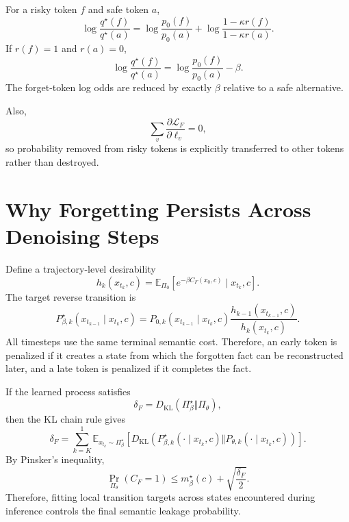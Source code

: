 \documentclass[10pt]{article}
\newcommand{\E}{\mathbb{E}}
\newcommand{\KL}{D_{\mathrm{KL}}}
\newcommand{\1}{\mathbb{I}}
\begin{document}
For a risky token $f$ and safe token $a$,
\begin{equation}
\log\frac{q^\star(f)}{q^\star(a)}
=
\log\frac{p_0(f)}{p_0(a)}
+
\log\frac{1-\kappa r(f)}{1-\kappa r(a)}.
\label{eq:odds}
\end{equation}
If $r(f)=1$ and $r(a)=0$,
\begin{equation}
\log\frac{q^\star(f)}{q^\star(a)}
=
\log\frac{p_0(f)}{p_0(a)}-\beta.
\end{equation}
The forget-token log odds are reduced by exactly $\beta$ relative to a safe alternative.

Also,
\begin{equation}
\sum_v\frac{\partial\mathcal L_F}{\partial\ell_v}=0,
\end{equation}
so probability removed from risky tokens is explicitly transferred to other tokens rather than destroyed.

\section{Why Forgetting Persists Across Denoising Steps}

Define a trajectory-level desirability
\begin{equation}
h_k(x_{t_k},c)
=
\E_{\Pi_0}
\left[
 e^{-\beta C_F(x_0,c)}
 \mid x_{t_k},c
\right].
\end{equation}
The target reverse transition is
\begin{equation}
P_{\beta,k}^\star(x_{t_{k-1}}\mid x_{t_k},c)
=
P_{0,k}(x_{t_{k-1}}\mid x_{t_k},c)
\frac{h_{k-1}(x_{t_{k-1}},c)}{h_k(x_{t_k},c)}.
\label{eq:doob}
\end{equation}
All timesteps use the same terminal semantic cost. Therefore, an early token is penalized if it creates a state from which the forgotten fact can be reconstructed later, and a late token is penalized if it completes the fact.

If the learned process satisfies
\begin{equation}
\delta_F
=
\KL(\Pi_\beta^\star\Vert\Pi_\theta),
\end{equation}
then the KL chain rule gives
\begin{equation}
\delta_F
=
\sum_{k=K}^{1}
\E_{x_{t_k}\sim\Pi_\beta^\star}
\left[
\KL\!\left(
P_{\beta,k}^\star(\cdot\mid x_{t_k},c)
\Vert
P_{\theta,k}(\cdot\mid x_{t_k},c)
\right)
\right].
\end{equation}
By Pinsker's inequality,
\begin{equation}
\Pr_{\Pi_\theta}(C_F=1)
\leq
m_\beta^\star(c)+\sqrt{\frac{\delta_F}{2}}.
\label{eq:bound}
\end{equation}
Therefore, fitting local transition targets across states encountered during inference controls the final semantic leakage probability.
\end{document}
